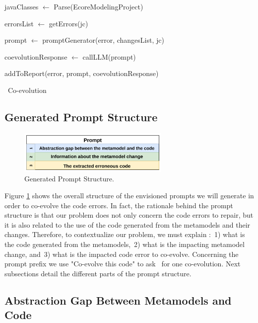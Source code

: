 \begin{algorithm2e}[t]
	\small
	\SetAlgoLined
	javaClasses $\leftarrow$ Parse(EcoreModelingProject)
	
	{
		errorsList $\leftarrow $ getErrors(jc)
		
		{
			prompt $\leftarrow$ promptGenerator(error, changesList, jc)
			
			coevolutionResponse $\leftarrow$ callLLM(prompt)
			
			addToReport(error, prompt, coevolutionResponse)
		}
	}
	
	
	\caption{\LLM~Co-evolution}
	\label{algo:overallalgo}
\end{algorithm2e}

\subsection{Generated Prompt Structure}

\begin{figure}[t]
	\centering
	\includegraphics[width=0.65\textwidth]{./pics/chapter3pics/promptTemplate.png}
	\caption{Generated Prompt Structure.}
	\label{fig:promptstructure}
	\vspace{-5mm}
\end{figure}

Figure \ref{fig:promptstructure} shows the overall structure of the envisioned prompts we will generate in order to co-evolve the code errors. In fact, the rationale behind the prompt structure is that our problem does not only concern the code errors to repair, but it is also related to the use of the code generated from the metamodels and their changes. Therefore, to contextualize our problem, we must explain :~1) what is the code generated from the metamodels,~2) what is the impacting metamodel change, and~3) what is the impacted code error to co-evolve.  Concerning the prompt prefix we use "Co-evolve this code" to ask \LLM~for one co-evolution. Next subsections detail the different parts of the prompt structure. 

\subsection{Abstraction Gap Between Metamodels and Code}


